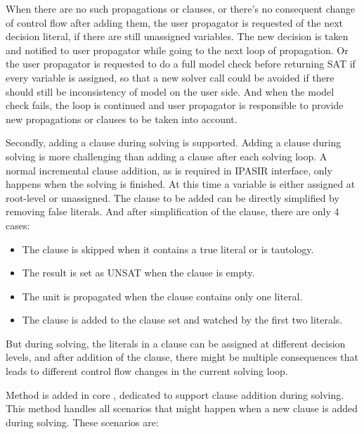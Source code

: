 When there are no such propagations or clauses, or there's no consequent change of control flow after adding them, the user propagator is requested of the next decision literal, if there are still unassigned variables. The new decision is taken and notified to user propagator while going to the next loop of propagation. Or the user propagator is requested to do a full model check before returning SAT if every variable is assigned, so that a new solver call could be avoided if there should still be inconsistency of model on the user side. And when the model check fails, the loop is continued and user propagator is responsible to provide new propagations or clauses to be taken into account.

Secondly, adding a clause during solving is supported. Adding a clause during solving is more challenging than adding a clause after each solving loop. A normal incremental clause addition, as is required in IPASIR interface, only happens when the solving is finished. At this time a variable is either assigned at root-level or unassigned. The clause to be added can be directly simplified by removing false literals. And after simplification of the clause, there are only 4 cases:

\begin{itemize}
  \item The clause is skipped when it contains a true literal or is tautology.
  \item The result is set as UNSAT when the clause is empty.
  \item The unit is propagated when the clause contains only one literal.
  \item The clause is added to the clause set and watched by the first two literals.
\end{itemize}

But during solving, the literals in a clause can be assigned at different decision levels, and after addition of the clause, there might be multiple consequences that leads to different control flow changes in the current solving loop.

Method  is added in core , dedicated to support clause addition during solving. This method handles all scenarios that might happen when a new clause is added during solving. These scenarios are:

